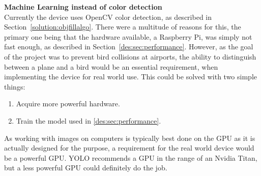 \textbf{Machine Learning instead of color detection}\\
Currently the device uses OpenCV color detection, as described in Section~\ref{solution:objfillalgo}.
There were a multitude of reasons for this, the primary one being that the hardware available, a Raspberry Pi, was simply not fast enough, as described in Section~\ref{des:sec:performance}.
However, as the goal of the project was to prevent bird collisions at airports, the ability to distinguish between a plane and a bird would be an essential requirement, when implementing the device for real world use.
This could be solved with two simple things:
\begin{enumerate}
    \item Acquire more powerful hardware.
    \item Train the model used in \ref{des:sec:performance}.
\end{enumerate}
As working with images on computers is typically best done on the GPU as it is actually designed for the purpose, a requirement for the real world device would be a powerful GPU.
YOLO recommends a GPU in the range of an Nvidia Titan, but a less powerful GPU could definitely do the job.
